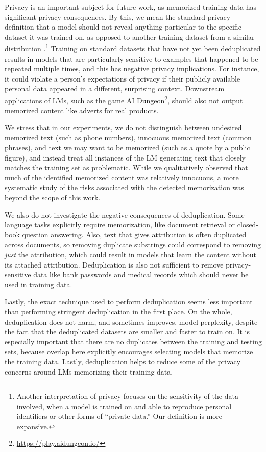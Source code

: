 Privacy is an important subject for future work, as memorized training data has significant privacy consequences.
By this, we mean the standard privacy definition that a model should not reveal anything particular to the specific dataset it was trained on, as opposed to another training dataset from a similar distribution \citep{shokri2017membership}.\footnote{%
Another interpretation of privacy focuses on the sensitivity of the data involved, when a model is trained on and able to reproduce personal identifiers or other forms of ``private data.'' Our definition is more expansive.}
Training on standard datasets that have not yet been deduplicated results in models that are particularly sensitive to examples that happened to be repeated multiple times, and this has negative privacy implications.
For instance, it could violate a person's expectations of privacy if their publicly available personal data appeared in a different, surprising context.
Downstream applications of LMs, such as the game AI Dungeon\footnote{\url{https://play.aidungeon.io/}}, should also not output memorized content like adverts for real products. 

We stress that in our experiments, we do not distinguish between undesired memorized text (such as phone numbers), innocuous memorized text (common phrases), and text we may want to be memorized (such as a quote by a public figure), and instead treat all instances of the LM generating text that closely matches the training set as problematic.
While we qualitatively observed that much of the identified memorized content was relatively innocuous, a more systematic study of the risks associated with the detected memorization was beyond the scope of this work.

We also do not investigate the negative consequences of deduplication.
Some language tasks explicitly require memorization, like document retrieval or closed-book question answering. 
Also, text that gives attribution is often duplicated across documents, so
removing duplicate substrings could correspond to removing \emph{just} the attribution, which could result in models that learn the content without its attached attribution.
Deduplication is also not sufficient to remove privacy-sensitive data like bank passwords and medical records which should never be used in training data.

Lastly, the exact technique used to perform deduplication seems less important than performing stringent deduplication in the first place.
On the whole, deduplication does not harm, and sometimes improves, model perplexity, despite the fact that the deduplicated datasets are smaller and faster to train on.
It is especially important that there are no duplicates between the training and testing sets, because overlap here explicitly encourages selecting models that memorize the training data.
Lastly, deduplication helps to reduce some of the privacy concerns around LMs memorizing their training data.


